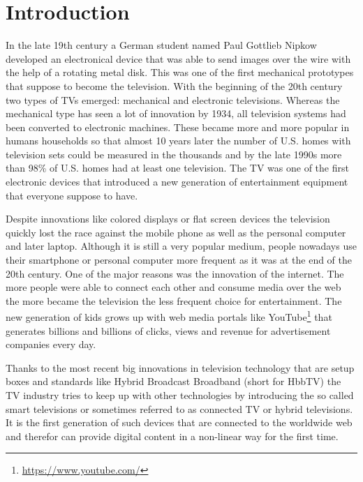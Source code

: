 %

\chapter{Introduction\label{cha:introduction}}

In the late 19th century a German student named Paul Gottlieb Nipkow developed an electronical device
that was able to send images over the wire with the help of a rotating metal disk. This was one of the first
mechanical prototypes that suppose to become the television. With the beginning of the 20th century two types
of TVs emerged: mechanical and electronic televisions. Whereas the mechanical type has seen a lot of
innovation by 1934, all television systems had been converted to electronic machines. These became more and
more popular in humans households so that almost 10 years later the number of U.S. homes with television sets
could be measured in the thousands and by the late 1990s more than 98\% of U.S. homes had at least one
television. The TV was one of the first electronic devices that introduced a new generation of entertainment
equipment that everyone suppose to have.

Despite innovations like colored displays or flat screen devices the television quickly lost the race against
the mobile phone as well as the personal computer and later laptop. Although it is still a very popular
medium, people nowadays use their smartphone or personal computer more frequent as it was at the end of the
20th century. One of the major reasons was the innovation of the internet. The more people were able to connect
each other and consume media over the web the more became the television the less frequent choice for
entertainment. The new generation of kids grows up with web media portals like YouTube\footnote{\url{https://www.youtube.com/}}
that generates billions and billions of clicks, views and revenue for advertisement companies every day.

Thanks to the most recent big innovations in television technology that are setup boxes and standards like
Hybrid Broadcast Broadband (short for HbbTV) the TV industry tries to keep up with other technologies by
introducing the so called smart televisions or sometimes referred to as connected TV or hybrid televisions.
It is the first generation of such devices that are connected to the worldwide web and therefor can provide
digital content in a non-linear way for the first time.

